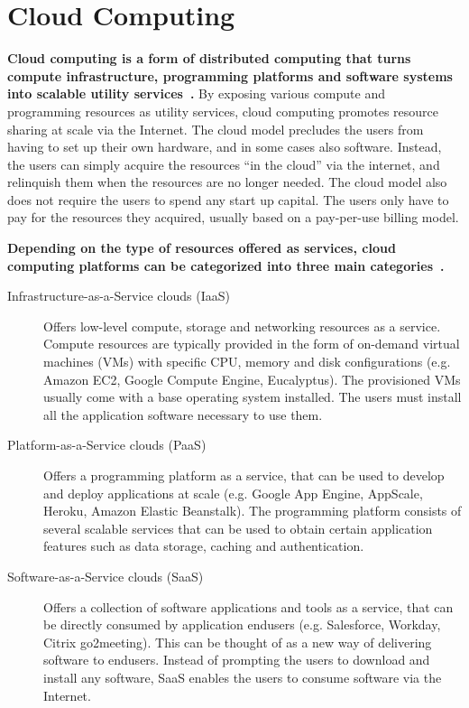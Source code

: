 \section{Cloud Computing}

\textbf{Cloud computing is a form of distributed computing that turns compute infrastructure, programming
platforms and software systems into scalable utility services~\cite{hassan2011demystifying,Mell:2011:SND:2206223}.}
By exposing various compute and programming
resources as utility services, cloud computing promotes resource sharing at scale via the Internet.
The cloud model precludes the users from having to set up their own hardware, and in some cases also software. Instead,
the users can simply acquire the resources ``in the cloud'' via the internet, and relinquish them when
the resources are no longer needed. The cloud model also does not require the users to spend any start up
capital. The users only have to pay for the resources they acquired, usually based on a pay-per-use
billing model.

\textbf{Depending on the type of resources
offered as services, cloud computing platforms can be categorized into three main categories~\cite{Mell:2011:SND:2206223}.}
\begin{description}
\item [Infrastructure-as-a-Service clouds (IaaS)]
Offers low-level compute, storage and networking
resources as a service. Compute resources are typically provided in the form of on-demand virtual machines (VMs)
with specific CPU, memory and disk configurations (e.g. Amazon EC2, Google Compute Engine, Eucalyptus). 
The provisioned VMs usually come with a base operating system installed. The users must install all the application software
necessary to use them.
\item [Platform-as-a-Service clouds (PaaS)]
Offers a programming platform as a service, that can be used to develop and deploy applications at scale 
(e.g. Google App Engine, AppScale, Heroku, Amazon Elastic Beanstalk). The programming platform consists
of several scalable services that can be used to obtain certain application features such as data storage, caching
and authentication.
\item [Software-as-a-Service clouds (SaaS)]
Offers a collection of software applications and tools as a service, that can be directly consumed by
application endusers (e.g. Salesforce, Workday, Citrix go2meeting). This can be thought of as a new way 
of delivering software to
endusers. Instead of prompting the users to download and install any software, SaaS enables the users
to consume software via the Internet.  
\end{description}

